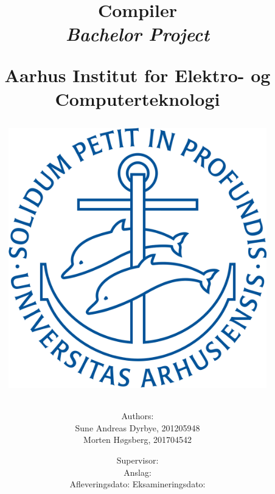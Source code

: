 \newcommand{\authorName}{}
\newcommand{\titleName}{Compiler}
\newcommand{\subject}{Bachelor Project}
\newcommand{\vejleder}{Supervisor: }
\newcommand{\institute}{Aarhus Institut for Elektro- og Computerteknologi}
\begin{titlepage}
  \centering
    \title
    {
      \Huge \textbf{\titleName}\\
      \scale{\numberSQRTTWO}{\vspace{\sol pt}}
      \LARGE \textit{\subject}
      \scale{\numberSQRTTWO}{\rule{\linewidth}{\sol pt}}

      \textbf{\institute}

      \begin{figure}[h]
        \centering
        \includegraphics[scale=0.2]{02-Body/Images/Aarhus_University_seal.png}
      \end{figure}

      \author
    {
      \LARGE Authors: \\
      Sune Andreas Dyrbye, 201205948 \\
      Morten Høgsberg, 201704542 \\
      }
           \date{
        \Large \vejleder \\
        \vspace{2em}
        Anslag: \\
        \vspace{2em}
        Afleveringsdato:  \hfill
        Eksamineringsdato: \\
      }


    }
   
\end{titlepage}
